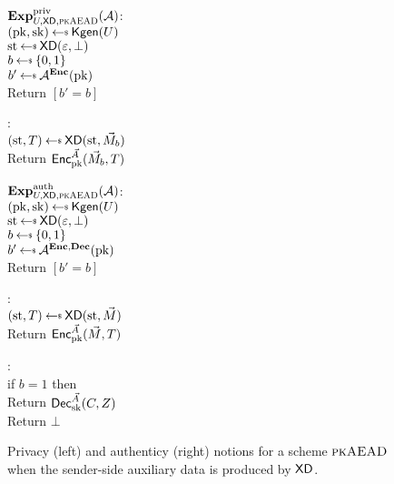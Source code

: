 \begin{figure}[tbhp]
\begin{center}
{
\underline{$\mathbf{Exp}^{\mathrm{priv}}_{U,\mathsf{XD},\textsc{pkAEAD}}{({\cal A})}$}:\\[2pt]
 $(\pk,\sk)\getsr\Kgen(\kreg)$\\
 $\st \getsr \mdalg(\emptystring,\bot)$\\
 $b\getsr\bits$\\
 $b'\getsr\advA^{\encOracle}(\pk)$\\
 Return $[b'=b]$

\medskip
{}:\\[2pt]
$(\st,\umd) \getsr \mdalg(\st,\vmsg_b)$\\
 Return ${\mathsf{Enc}}_{\mathrm{pk}}^{\vec{A}}(\vec{M}_b, T)$

}
{
\underline{$\mathbf{Exp}^{\mathrm{auth}}_{U,\mathsf{XD},\textsc{pkAEAD}}{({\cal A})}$}:\\[2pt]
 $(\pk,\sk)\getsr\Kgen(\kreg)$\\
 $\st \getsr \mdalg(\emptystring,\bot)$\\
 $b\getsr\bits$\\
 $b'\getsr\advA^{\encOracle,\decOracle}(\pk)$\\
 Return $[b'=b]$

\medskip
\Oracle{$\encOracle(\vad,\vmsg)$}:\\[2pt]
 $(\st,\umd) \getsr \mdalg(\st,\vmsg)$\\
 Return ${\mathsf{Enc}}_{\mathrm{pk}}^{\vec{A}}(\vec{M},T)$

\medskip
{}:\\[2pt]
 if $b=1$ then\\
 \nudge Return ${\mathsf{Dec}}_{\mathrm{sk}}^{\vec{A}}(C,Z)$\\
Return $\bot$
}
\caption{Privacy (left) and authenticy (right) notions for a scheme $\textsc{pkAEAD}$ when the sender-side auxiliary data is produced by $\mathsf{XD}$.}
\label{fig:pkaead-notions}
\end{center}
\end{figure}




